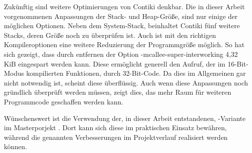 Zukünftig sind weitere Optimierungen von Contiki denkbar. Die in dieser Arbeit vorgenommenen Anpassungen der Stack- und Heap-Größe,
sind nur einige der möglichen Optionen. Neben dem System-Stack, beinhaltet Contiki fünf weitere Stacks, deren Größe noch zu überprüfen ist.
Auch ist mit den richtigen Kompileroptionen eine weitere Reduzierung der Programmgröße möglich. So hat sich gezeigt, dass durch
entfernen der Option -mcallee-super-interworking 4,32 KiB eingespart werden kann. Diese ermöglicht generell den Aufruf, der im 16-Bit-Modus
kompilierten Funktionen, durch 32-Bit-Code. Da dies im Allgemeinen gar nicht notwendig ist, scheint diese überflüssig.
Auch wenn diese Anpassungen noch gründlich überprüft werden müssen, zeigt dies, das mehr Raum für weiteren Programmcode geschaffen werden kann.

Wünschenswert ist die Verwendung der, in dieser Arbeit entstandenen, -Variante im Masterporjekt .
Dort kann sich diese im praktischen Einsatz bewähren, während die genannten Verbesserungen im Projektverlauf realisiert werden können.
